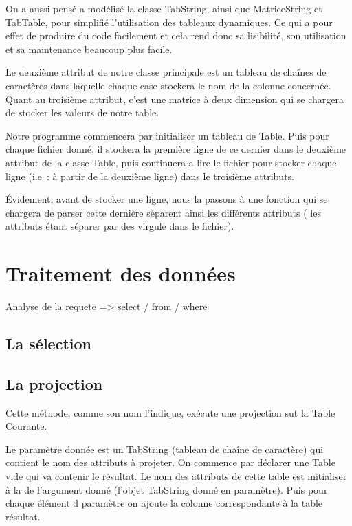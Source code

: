 \documentclass[oneside,13pt,a4paper]{report}
\begin{document}
            On a aussi pensé a modélisé la classe TabString, ainsi que MatriceString et TabTable, pour simplifié l’utilisation des tableaux dynamiques. Ce qui a pour effet de produire du code facilement et cela rend donc sa lisibilité, son utilisation et sa maintenance beaucoup plus facile.

            Le deuxième attribut de notre classe principale est un tableau de chaînes de caractères dans laquelle chaque case stockera le nom de la colonne concernée. Quant au troisième attribut, c’est une matrice à deux dimension qui se chargera de stocker les valeurs de notre table.
            
            Notre programme commencera par initialiser un tableau de Table. Puis pour chaque fichier donné, il stockera la première ligne de ce dernier dans le deuxième attribut de la classe Table, puis continuera a lire le fichier pour stocker chaque ligne (i.e : à partir de la deuxième ligne) dans le troisième attributs.

            Évidement, avant de stocker une ligne, nous la passons à une fonction qui se chargera de parser cette dernière séparent ainsi les différents attributs ( les attributs étant séparer par des virgule dans le fichier).

        \section{Traitement des données}

            Analyse de la requete => select / from / where

            \subsection{La sélection}

            \subsection{La projection}

                Cette méthode, comme son nom l'indique, exécute une projection sut la Table Courante.

	            Le paramètre donnée est un TabString (tableau de chaîne de caractère) qui contient le nom des attributs à projeter.
                On commence par déclarer une Table vide qui va contenir le résultat.
                Le nom des attributs de cette table est initialiser à la de l'argument donné (l'objet TabString donné en paramètre).
                Puis pour chaque élément d paramètre on ajoute la colonne correspondante à la table résultat.
\end{document}
